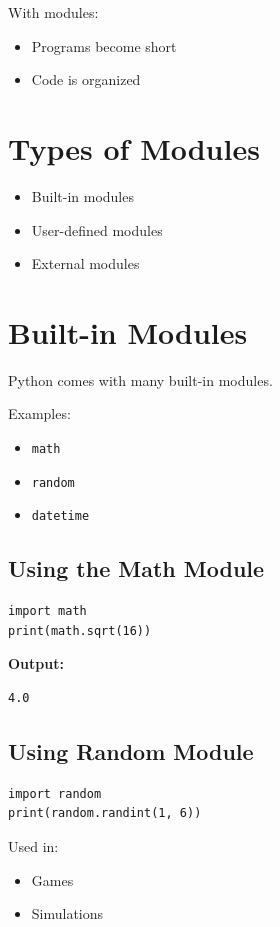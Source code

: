 With modules:
\begin{itemize}
    \item Programs become short
    \item Code is organized
\end{itemize}

\section{Types of Modules}

\begin{itemize}
    \item Built-in modules
    \item User-defined modules
    \item External modules
\end{itemize}

\section{Built-in Modules}

Python comes with many built-in modules.

Examples:
\begin{itemize}
    \item \texttt{math}
    \item \texttt{random}
    \item \texttt{datetime}
\end{itemize}

\subsection{Using the Math Module}

\begin{verbatim}
import math
print(math.sqrt(16))
\end{verbatim}

\textbf{Output:}
\begin{verbatim}
4.0
\end{verbatim}

\subsection{Using Random Module}

\begin{verbatim}
import random
print(random.randint(1, 6))
\end{verbatim}

Used in:
\begin{itemize}
    \item Games
    \item Simulations
\end{itemize}

